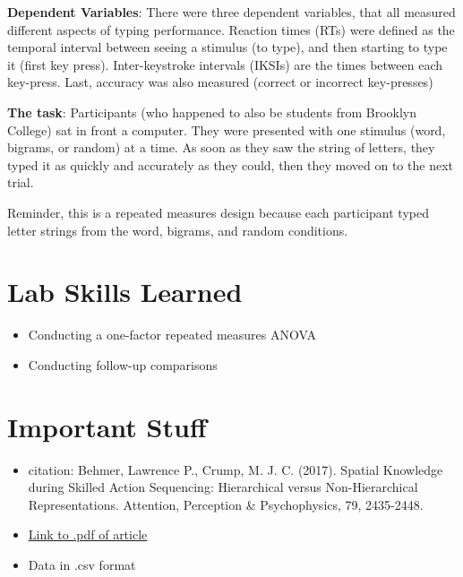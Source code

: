 \documentclass[
]{book}
\providecommand{\tightlist}{%
  \setlength{\itemsep}{0pt}\setlength{\parskip}{0pt}}
\begin{document}
\textbf{Dependent Variables}: There were three dependent variables, that all measured different aspects of typing performance. Reaction times (RTs) were defined as the temporal interval between seeing a stimulus (to type), and then starting to type it (first key press). Inter-keystroke intervals (IKSIs) are the times between each key-press. Last, accuracy was also measured (correct or incorrect key-presses)

\textbf{The task}: Participants (who happened to also be students from Brooklyn College) sat in front a computer. They were presented with one stimulus (word, bigrams, or random) at a time. As soon as they saw the string of letters, they typed it as quickly and accurately as they could, then they moved on to the next trial.

Reminder, this is a repeated measures design because each participant typed letter strings from the word, bigrams, and random conditions.

\hypertarget{lab-skills-learned-3}{%
\section{Lab Skills Learned}\label{lab-skills-learned-3}}

\begin{itemize}
\tightlist
\item
  Conducting a one-factor repeated measures ANOVA
\item
  Conducting follow-up comparisons
\end{itemize}

\hypertarget{important-stuff-3}{%
\section{Important Stuff}\label{important-stuff-3}}

\begin{itemize}
\tightlist
\item
  citation: Behmer, Lawrence P., Crump, M. J. C. (2017). Spatial Knowledge during Skilled Action Sequencing: Hierarchical versus Non-Hierarchical Representations. Attention, Perception \& Psychophysics, 79, 2435-2448.
\item
  \href{https://github.com/CrumpLab/CrumpLab.github.io/raw/master/files/8753/Behmer\%20and\%20Crump\%20-\%202017.pdf}{Link to .pdf of article}
\item
  Data in .csv format
\end{itemize}
\end{document}
